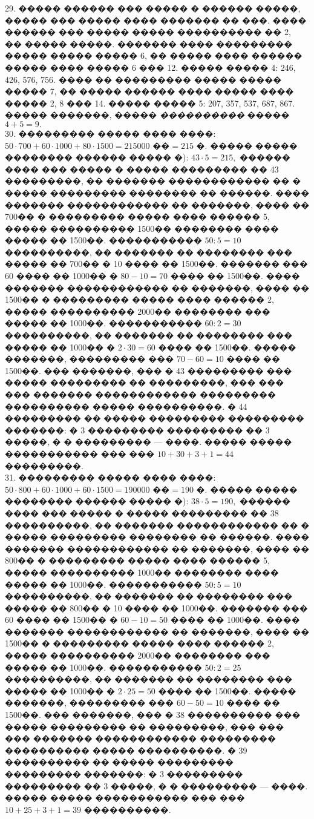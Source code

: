 \documentclass[12pt]{article}
\begin{document}
29. ����� ������ ��� ����� � ������ �����, ����� ��� ����� ���� ������� �� ���. ���� ������ ��� ����� ����� ���������� �� 2, �� ����� �����. ������� ���� ��������� ����� ����� ����� 6, �� ����� ���� ������ ����� ���� ����� 6 ��� 12. ����� ����� 4: 246, 426, 576, 756. ���� �� ��������� ����� ����� ����� 7, �� ����� ������ ���� ����� ���� ����� 2, 8 ��� 14. ����� ����� 5: 207, 357, 537, 687, 867. ����� �������, ����� {\it ����������} ����� $4+5=9.$\\
30. ��������� ����� ���� ����: $50\cdot700+60\cdot1000+80\cdot1500=215000\text{ ��}=215\text{ �}.$ ����� ����� �������� ������ ����� �): $43\cdot5=215,$ ������ ���� ��� ����� � ����� ��������� �� 43 ���������, �� ������� ������������ �� � ����� ��������� �������� �� ������. ���� ������� ������������ �� �������, ���� �� 700�� � ��������� ����� ���� ������ 5, ����� ���������� 1500�� �������� ���� ����� �� 1500��. ����������� $50:5=10$ ����������, �� ������� �� �������� ��� ����� �� 700�� � 10 ���� �� 1500��. ������� ��� 60 ���� �� 1000�� � $80-10=70$ ���� �� 1500��. ���� ������� ������������ �� �������, ���� �� 1500�� � ��������� ����� ���� ������ 2, ����� ���������� 2000�� �������� ��� ����� �� 1000��. ����������� $60:2=30$ ����������, �� ������� �� �������� ��� ����� �� 1000�� � $2\cdot30=60$ ���� �� 1500��. ����� �������, ��������� ��� $70-60=10$ ���� �� 1500��. ��� �������, ��� � 43 ��������� ��� ����� ��������� �� ���������, ��� ��� ��� ������� ������������ ��������� ���������� ����� ����������. � 44 ��������� �� ����� ��������� ��������� �������: � 3 ��������� ��������� �� 3 �����, � � ��������� --- ����. ����� ����� ����������� ��� ��� $10+30+3+1=44$ ���������.\\
31. ��������� ����� ���� ����: $50\cdot800+60\cdot1000+60\cdot1500=190000\text{ ��}=190\text{ �}.$ ����� ����� �������� ������ ����� �): $38\cdot5=190,$ ������ ���� ��� ����� � ����� ��������� �� 38 ����������, �� ������� ������������ �� � ����� ��������� �������� �� ������. ���� ������� ������������ �� �������, ���� �� 800�� � ��������� ����� ���� ������ 5, ����� ���������� 1000�� �������� ���� ����� �� 1000��. ����������� $50:5=10$ ����������, �� ������� �� �������� ��� ����� �� 800�� � 10 ���� �� 1000��. ������� ��� 60 ���� �� 1500�� � $60-10=50$ ���� �� 1000��. ���� ������� ������������ �� �������, ���� �� 1500�� � ��������� ����� ���� ������ 2, ����� ���������� 2000�� �������� ��� ����� �� 1000��. ����������� $50:2=25$ ����������, �� ������� �� �������� ��� ����� �� 1000�� � $2\cdot25=50$ ���� �� 1500��. ����� �������, ��������� ��� $60-50=10$ ���� �� 1500��. ��� �������, ��� � 38 ���������� ��� ����� ��������� �� ���������, ��� ��� ��� ������� ������������ ��������� ���������� ����� ����������. � 39 ���������� �� ����� ��������� ��������� �������: � 3 ��������� ��������� �� 3 �����, � � ��������� --- ����. ����� ����� ����������� ��� ��� $10+25+3+1=39$ ����������.\\
\end{document}
